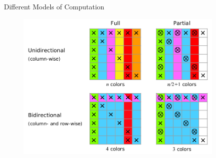 \documentclass{beamer}
\begin{document}
\begin{frame}{Different Models of Computation}
\begin{figure}
\centering
\includegraphics[width=0.9\textwidth]{fullvsPart}
\end{figure}
\end{frame}
\end{document}
